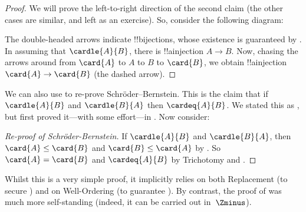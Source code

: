 \documentclass[../../../include/open-logic-section]{subfiles}
\begin{document}
\begin{proof}
We will prove the left-to-right direction of the second claim (the
other cases are similar, and left as an exercise). So, consider the
following diagram:
\begin{center}
\end{center}
The double-headed arrows indicate !!{bijection}s, whose existence is
guaranteed by . In assuming that
$\cardle{A}{B}$, there is !!a{injection}  $A\to B$. Now,
chasing the arrows around from $\card{A}$ to $A$ to $B$ to $\card{B}$,
we obtain !!a{injection} $\card{A} \to \card{B}$ (the dashed arrow).
\end{proof}\noindent We can also use 
to re-prove Schr\"{o}der--Bernstein. This is the claim that if
$\cardle{A}{B}$ and $\cardle{B}{A}$ then $\cardeq{A}{B}$. We stated
this as , but first proved
it---with some effort---in .
Now consider:

\begin{proof}[Re-proof of Schr\"oder-Bernstein]
If $\cardle{A}{B}$ and $\cardle{B}{A}$, then $\card{A} \leq \card{B}$
and $\card{B} \leq \card{A}$ by . So
$\card{A} = \card{B}$ and $\cardeq{A}{B}$ by Trichotomy and
.
\end{proof}
\noindent
Whilst this is a very simple proof, it implicitly relies on both
Replacement (to secure
) and on
Well-Ordering (to guarantee ). By
contrast, the proof of  was much
more self-standing (indeed, it can be carried out in~$\Zminus$).
\end{document}
